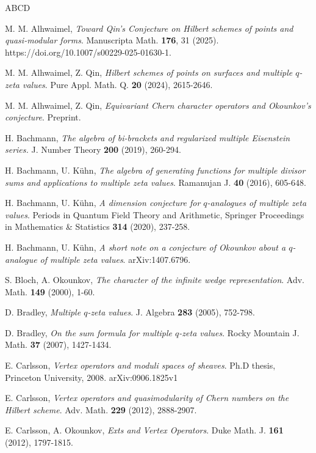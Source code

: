 \documentclass[12pt, reqno]{amsart}
\theoremstyle{definition}
\theoremstyle{remark}
\numberwithin{equation}{section}
\numberwithin{equation}{section}
\begin{document}
\begin{thebibliography}{ABCD}

 M. M. Alhwaimel,
{\em Toward Qin's Conjecture on Hilbert schemes of points 
and quasi-modular forms}. Manuscripta Math. {\bf 176}, 31 (2025). 
https://doi.org/10.1007/s00229-025-01630-1.

 M. M. Alhwaimel, Z. Qin,
{\em Hilbert schemes of points on surfaces and multiple $q$-zeta values}. 
Pure Appl. Math. Q. {\bf 20} (2024), 2615-2646.

 M. M. Alhwaimel, Z. Qin, 
{\em Equivariant Chern character operators and Okounkov's conjecture}. Preprint. 

 H. Bachmann, 
{\em The algebra of bi-brackets and regularized multiple Eisenstein 
series.} J. Number Theory {\bf 200} (2019), 260-294. 

 H. Bachmann, U. K\" uhn,
{\em The algebra of generating functions for multiple divisor sums and applications to multiple zeta values}. Ramanujan J. {\bf 40} (2016), 605-648.

 H. Bachmann, U. K\" uhn,
{\em A dimension conjecture for $q$-analogues of multiple zeta values}. 
Periods in Quantum Field Theory and Arithmetic, Springer Proceedings 
in Mathematics \& Statistics {\bf 314} (2020), 237-258.

 H. Bachmann, U. K\" uhn,
{\em A short note on a conjecture of Okounkov
about a $q$-analogue of multiple zeta values}. arXiv:1407.6796.

 S. Bloch, A. Okounkov, 
{\em The character of the infinite wedge representation}.
Adv. Math. {\bf 149} (2000), 1-60.

 D. Bradley,
{\em Multiple $q$-zeta values}. J. Algebra {\bf 283} (2005), 752-798.

 D. Bradley,
{\em On the sum formula for multiple $q$-zeta values}. 
Rocky Mountain J. Math. {\bf 37} (2007), 1427-1434.

 E. Carlsson, 
{\em Vertex operators and moduli spaces of sheaves}. 
Ph.D thesis, Princeton University, 2008. arXiv:0906.1825v1

 E. Carlsson, 
{\em Vertex operators and quasimodularity of Chern numbers on the Hilbert scheme}. 
Adv. Math. {\bf 229} (2012), 2888-2907.

 E. Carlsson, A. Okounkov,
{\em Exts and Vertex Operators}. Duke Math. J. {\bf 161} (2012), 1797-1815.


\end{thebibliography}
\end{document}
